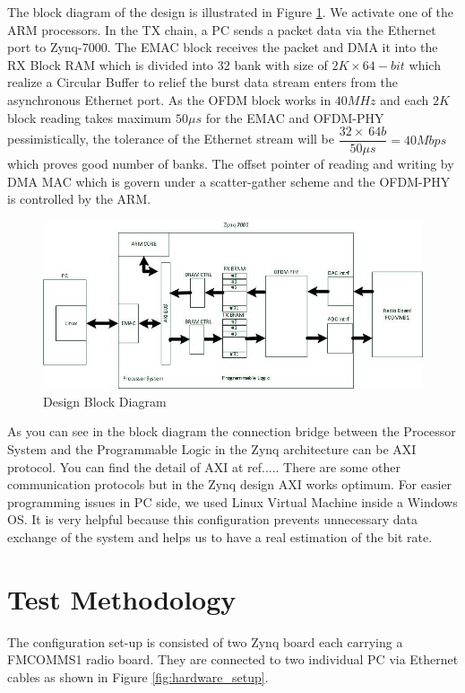 The block diagram of the design is illustrated in Figure \ref{fig:design_block_diagram}. We activate one of the ARM processors. In the TX chain, a PC sends a packet data via the Ethernet port to Zynq-7000. The EMAC block receives the packet and DMA it into the RX Block RAM which is divided into $32$ bank with size of $2K \times 64-bit$ which realize a Circular Buffer to relief the burst data stream enters from the asynchronous Ethernet port. As the OFDM block works in $40 MHz$ and each $2K$ block reading takes maximum $50\mu s$ for the EMAC and OFDM-PHY pessimistically, the tolerance of the Ethernet stream will be $\dfrac{32 \times \ 64b}{50\mu s} = 40Mbps$ which proves good number of banks. The offset pointer of reading and writing by DMA MAC which is govern under a scatter-gather scheme and the OFDM-PHY is controlled by the ARM.\\

\begin{figure}
\centering
\includegraphics[width=12cm]{content/fig/fpga_internal.JPG}
\caption{Design Block Diagram}
\label{fig:design_block_diagram}
\end{figure}

As you can see in the block diagram the connection bridge between the Processor System and the Programmable Logic in the Zynq architecture can be AXI protocol. You can find the detail of AXI at ref..... There are some other communication protocols but in the Zynq design AXI works optimum.
For easier programming issues in PC side, we used Linux Virtual Machine inside a Windows OS. It is very helpful because this configuration prevents unnecessary data exchange of the system and helps us to have a real estimation of the bit rate.\\

\section{Test Methodology}
The configuration set-up is consisted of two Zynq board each carrying a FMCOMMS1 radio board. They are connected to two individual PC via Ethernet cables as shown in Figure \ref{fig:hardware_setup}.\\

